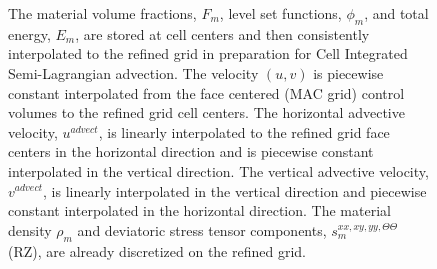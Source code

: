 \documentclass[]{article}
\begin{document}
\begin{figure}
\begin{tikzpicture}
\end{tikzpicture}
\caption{
	The material volume fractions, $F_{m}$, level set functions,
	$\phi_{m}$, and total energy, $E_{m}$, are stored at cell
	centers and then consistently interpolated to the refined grid
	in preparation for Cell Integrated Semi-Lagrangian 
	advection\cite{jemison2014compressible,scardovelli2003interface}.
	The velocity $(u,v)$ is piecewise constant interpolated from the 
	face centered (MAC grid) control volumes to the refined grid
	cell centers.  The horizontal advective velocity, $u^{advect}$,
	is linearly interpolated to the refined grid face centers in the
	horizontal direction and is piecewise constant interpolated in the
	vertical direction.  The vertical advective velocity, $v^{advect}$,
	is linearly interpolated in the vertical direction and piecewise
	constant interpolated in the horizontal direction.
	The material density $\rho_{m}$ and deviatoric stress tensor
	components, 
	$s_{m}^{xx,xy,yy,\Theta\Theta}$ (RZ), 
	are already
	discretized on the refined grid.
 \label{prolongation}}
\end{figure}
\end{document}
